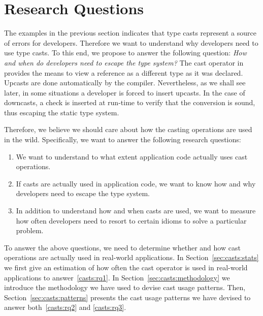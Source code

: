\section{Research Questions}

The examples in the previous section indicates that type casts represent a source of errors for developers.
Therefore we want to understand why developers need to use type casts.
To this end, we propose to answer the following question:
\emph{How and when do developers need to escape the type system?}
The cast operator in \java{} provides the means to view a reference as a different type as it was declared.
Upcasts are done automatically by the compiler.
Nevertheless, as we shall see later, in some situations a developer is forced to insert upcasts.
In the case of downcasts, a check is inserted at run-time to verify that the conversion is sound, thus escaping the static type system.

Therefore, we believe we should care about how the casting operations are used in the wild.
Specifically, we want to answer the following research questions:

\begin{enumerate}[label=$RQ/C\arabic*:$,ref=$RQ/C\arabic*$,leftmargin=3.4\parindent]
\item\label{enum:rq1}{\bf \crqA}
We want to understand to what extent application code actually uses cast operations.
\item\label{enum:rq2}{\bf \crqB}
If casts are actually used in application code, we want to know how and why developers need to escape the type system.
\item\label{enum:rq3}{\bf \crqC}
In addition to understand how and when casts are used, we want to measure how often developers need to resort to certain idioms to solve a particular problem.
\end{enumerate}

To answer the above questions, we need to determine whether and how cast operations are actually used in real-world \java{} applications.
In Section~\ref{sec:casts:stats} we first give an estimation of how often the cast operator is used in real-world applications to answer~\ref{casts:rq1}.
In Section~\ref{sec:casts:methodology} we introduce the methodology we have used to devise cast usage patterns.
Then, Section~\ref{sec:casts:patterns} presents the cast usage patterns we have devised to answer both~\ref{casts:rq2} and \ref{casts:rq3}.
